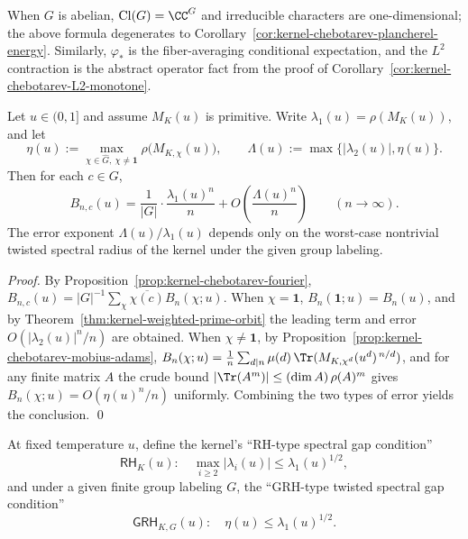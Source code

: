 \begin{remark}\label{rem:kernel-chebotarev-plancherel-nonabelian-abelian}
When \(G\) is abelian, \(\mathrm{Cl}(G)=\CC^{G}\) and irreducible characters are one-dimensional; the above formula degenerates to Corollary~\ref{cor:kernel-chebotarev-plancherel-energy}.
Similarly, \(\varphi_\ast\) is the fiber-averaging conditional expectation, and the \(L^2\) contraction is the abstract operator fact from the proof of Corollary~\ref{cor:kernel-chebotarev-L2-monotone}.
\end{remark}

\begin{theorem}\label{thm:kernel-chebotarev-exp}
Let $u\in(0,1]$ and assume $M_K(u)$ is primitive. Write $\lambda_1(u)=\rho(M_K(u))$, and let
\[
\eta(u):=\max_{\chi\in\widehat G,\ \chi\ne\mathbf{1}}\rho\bigl(M_{K,\chi}(u)\bigr),
\qquad
\Lambda(u):=\max\{|\lambda_2(u)|,\eta(u)\}.
\]
Then for each $c\in G$,
\[
B_{n,c}(u)=\frac{1}{|G|}\cdot\frac{\lambda_1(u)^n}{n}+O\!\left(\frac{\Lambda(u)^n}{n}\right)\qquad(n\to\infty).
\]
The error exponent $\Lambda(u)/\lambda_1(u)$ depends only on the worst-case nontrivial twisted spectral radius of the kernel under the given group labeling.
\end{theorem}

\begin{proof}
By Proposition~\ref{prop:kernel-chebotarev-fourier},
\(
B_{n,c}(u)=|G|^{-1}\sum_{\chi}\overline{\chi(c)}B_n(\chi;u).
\)
When $\chi=\mathbf{1}$, $B_n(\mathbf{1};u)=B_n(u)$, and by Theorem~\ref{thm:kernel-weighted-prime-orbit} the leading term and error $O(|\lambda_2(u)|^n/n)$ are obtained.
When $\chi\ne\mathbf{1}$, by Proposition~\ref{prop:kernel-chebotarev-mobius-adams},
\(
B_n(\chi;u)=\frac{1}{n}\sum_{d\mid n}\mu(d)\,\Tr(M_{K,\chi^d}(u^d)^{\,n/d})
\),
and for any finite matrix $A$ the crude bound $|\Tr(A^m)|\le (\dim A)\,\rho(A)^m$ gives
\(
B_n(\chi;u)=O(\eta(u)^n/n)
\)
uniformly. Combining the two types of error yields the conclusion. \qed
\end{proof}

\begin{definition}\label{def:kernel-rh}
At fixed temperature $u$, define the kernel's ``RH-type spectral gap condition''
\[
\textsf{RH}_K(u):\quad \max_{i\ge 2}|\lambda_i(u)|\le \lambda_1(u)^{1/2},
\]
and under a given finite group labeling $G$, the ``GRH-type twisted spectral gap condition''
\[
\textsf{GRH}_{K,G}(u):\quad \eta(u)\le \lambda_1(u)^{1/2}.
\]
\end{definition}

